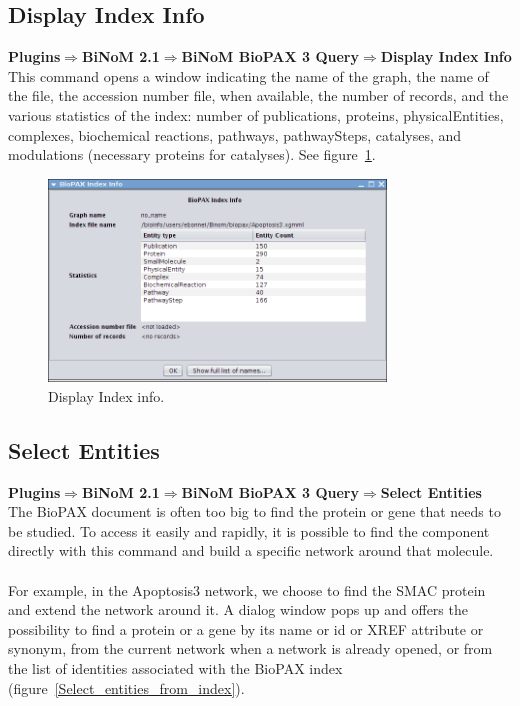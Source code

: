\subsection{Display Index Info}
\textbf{Plugins$\Rightarrow$BiNoM 2.1$\Rightarrow$BiNoM BioPAX 3 Query$\Rightarrow$Display Index Info}\\

This command opens a window indicating the name of the graph, the name of the
file, the accession number file, when available, the number of records, and the
various statistics of the index: number of publications, proteins,
physicalEntities, complexes, biochemical reactions, pathways, pathwaySteps,
catalyses, and modulations (necessary proteins for catalyses). See
figure~\ref{BioPAX_Index_Info}.

\begin{figure}[h]
\centering
\includegraphics[width=0.8\textwidth]{graphics/ebo_biopax_index_info}
\caption{Display Index info.}
\label{BioPAX_Index_Info}
\end{figure}

\subsection{Select Entities}
\textbf{Plugins$\Rightarrow$BiNoM 2.1$\Rightarrow$BiNoM BioPAX 3 Query$\Rightarrow$Select Entities}\\

The BioPAX document is often too big to find the protein or gene that needs to
be studied. To access it easily and rapidly, it is possible to find the
component directly with this command and build a specific network around that
molecule.\\\\
For example, in the Apoptosis3 network, we choose to find the SMAC protein and extend the
network around it. A dialog window pops up and offers the possibility to
find a protein or a gene by its name or id or XREF attribute or synonym, from
the current network when a network is already opened, or from the list of
identities associated with the BioPAX index
(figure~\ref{Select_entities_from_index}).\\\\

